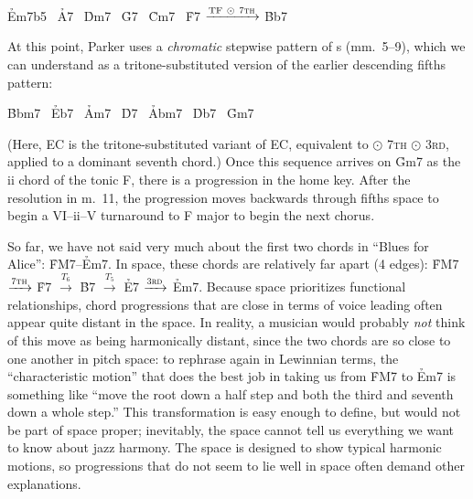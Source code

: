 {\begin{center}
  \h{Em7b5} \TFarrow\ \h{A7} \ECarrow\
  \h{Dm7}   \TFarrow\ \h{G7} \ECarrow\
  \h{Cm7}   \TFarrow\ \h{F7} $\xrightarrow{\mathrm{TF}\ \odot\ \text{\textsc{7th}}}$
  \h{Bb7}
\end{center}


At this point, Parker uses a \emph{chromatic} stepwise pattern of \tf{}s
(mm.~5--9), which we can understand as a tritone-substituted version of the
earlier descending fifths pattern:

\begin{center}
  \h{Bbm7} \TFarrow\ \h{Eb7} \ECTarrow\
  \h{Am7}  \TFarrow\ \h{D7}  \ECTarrow\
  \h{Abm7} \TFarrow\ \h{Db7} \ECTarrow\
  \h{Gm7}
\end{center}

\noindent (Here, EC\tsub{T} is the tritone-substituted variant of EC,
equivalent to \tft $\odot$ \textsc{7th} $\odot$ \textsc{3rd}, applied to a
dominant seventh chord.) Once this sequence arrives on \h{Gm7} as the ii chord
of the tonic F, there is a \tfo progression in the home key. After the
resolution in m.~11, the progression moves backwards through fifths space to
begin a VI--ii--V turnaround to F major to begin the next chorus.

So far, we have not said very much about the first two chords in ``Blues for
Alice'': \h{FM7}--\h{Em7}. In \tf space, these chords are relatively far
apart (4 edges): \h{FM7} $\xrightarrow{\text{\textsc{7th}}}$ \h{F7} $\xrightarrow{T_6}$
\h{B7} $\xrightarrow{T_5}$ \h{E7} $\xrightarrow{\text{\textsc{3rd}}}$ \h{Em7}.
Because \tf space prioritizes functional relationships, chord progressions
that are close in terms of voice leading often appear quite distant in the
space. In reality, a musician would probably \emph{not} think of this move as
being harmonically distant, since the two chords are so close to one another
in pitch space: to rephrase again in Lewinnian terms, the ``characteristic
motion'' that does the best job in taking us from \h{FM7} to \h{Em7} is
something like ``move the root down a half step and both the third and seventh
down a whole step.'' This transformation is easy enough to define, but would
not be part of \tf space proper; inevitably, the space cannot tell us
everything we want to know about jazz harmony. The space is designed to show
typical harmonic motions, so progressions that do not seem to lie well in \tf
space often demand other explanations.

}
